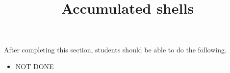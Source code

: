 \documentclass{ximera}
\title{Accumulated shells}
\begin{document}
\begin{abstract}
\end{abstract}

\maketitle

\begin{sectionOutcomes}

After completing this section, students should be able to do the following.

\begin{itemize}
\item NOT DONE
\end{itemize}

\end{sectionOutcomes}
\end{document}
